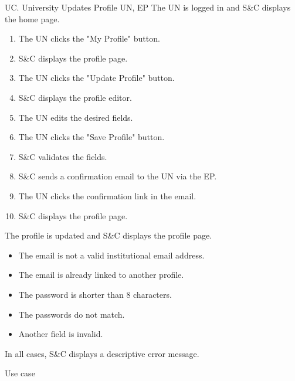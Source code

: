 \clearpage
\begin{usecase}
    {UC\theuc. University Updates Profile}
    {UN, EP}
    {The UN is logged in and S\&C displays the home page.}
    {\begin{enumerate}[leftmargin=*]
        \item The UN clicks the "My Profile" button.
        \item S\&C displays the profile page.
        \item The UN clicks the "Update Profile" button.
        \item S\&C displays the profile editor.
        \item The UN edits the desired fields.
        \item The UN clicks the "Save Profile" button.
        \item S\&C validates the fields.
        \item S\&C sends a confirmation email to the UN via the EP.
        \item The UN clicks the confirmation link in the email.
        \item S\&C displays the profile page.
    \end{enumerate}}
    {The profile is updated and S\&C displays the profile page.}
    {\begin{itemize}[leftmargin=*, label=\tiny\textbullet]
        \item The email is not a valid institutional email address.
        \item The email is already linked to another profile.
        \item The password is shorter than 8 characters.
        \item The passwords do not match.
        \item Another field is invalid.
    \end{itemize}
    In all cases, S\&C displays a descriptive error message.}
    {Use case \theuc}
\end{usecase}

